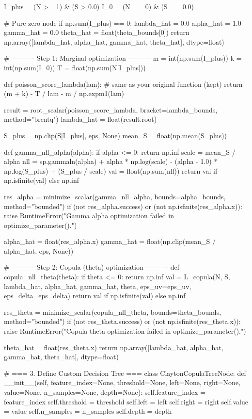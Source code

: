     I_plus = (N >= 1) & (S > 0.0)
    I_0    = (N == 0) & (S == 0.0)

    # Pure zero node
    if np.sum(I_plus) == 0:
        lambda_hat = 0.0
        alpha_hat  = 1.0
        gamma_hat  = 0.0
        theta_hat  = float(theta_bounds[0])
        return np.array([lambda_hat, alpha_hat, gamma_hat, theta_hat], dtype=float)

    # ---------- Step 1: Marginal optimization ----------
    m = int(np.sum(I_plus))
    k = int(np.sum(I_0))
    T = float(np.sum(N[I_plus]))

    def poisson_score_lambda(lam):
        # same as your original function (kept)
        return (m + k) - T / lam - m / np.expm1(lam)

    result = root_scalar(poisson_score_lambda, bracket=lambda_bounds, method="brentq")
    lambda_hat = float(result.root)

    S_plus = np.clip(S[I_plus], eps, None)
    mean_S = float(np.mean(S_plus))

    def gamma_nll_alpha(alpha):
        if alpha <= 0:
            return np.inf
        scale = mean_S / alpha
        nll = sp.gammaln(alpha) + alpha * np.log(scale) - (alpha - 1.0) * np.log(S_plus) + (S_plus / scale)
        val = float(np.sum(nll))
        return val if np.isfinite(val) else np.inf

    res_alpha = minimize_scalar(gamma_nll_alpha, bounds=alpha_bounds, method="bounded")
    if (not res_alpha.success) or (not np.isfinite(res_alpha.x)):
        raise RuntimeError("Gamma alpha optimization failed in optimize_parameter().")

    alpha_hat = float(res_alpha.x)
    gamma_hat = float(np.clip(mean_S / alpha_hat, eps, None))

    # ---------- Step 2: Copula (theta) optimization ----------
    def copula_nll_theta(theta):
        if theta <= 0:
            return np.inf
        val = L_copula(N, S, lambda_hat, alpha_hat, gamma_hat, theta, eps_uv=eps_uv, eps_delta=eps_delta)
        return val if np.isfinite(val) else np.inf

    res_theta = minimize_scalar(copula_nll_theta, bounds=theta_bounds, method="bounded")
    if (not res_theta.success) or (not np.isfinite(res_theta.x)):
        raise RuntimeError("Copula theta optimization failed in optimize_parameter().")

    theta_hat = float(res_theta.x)
    return np.array([lambda_hat, alpha_hat, gamma_hat, theta_hat], dtype=float)


# === 3. Define Custom Decision Tree ===
class ClaytonCopulaTreeNode:
    def __init__(self, feature_index=None, threshold=None, left=None, right=None,
                 value=None, n_samples=None, depth=None):
        self.feature_index = feature_index
        self.threshold = threshold
        self.left = left
        self.right = right
        self.value = value
        self.n_samples = n_samples
        self.depth = depth



